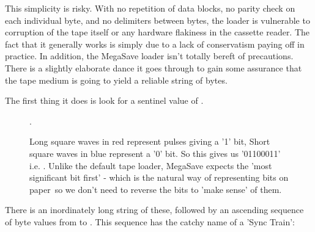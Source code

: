 
	
This simplicity is risky. With no repetition of data blocks, no parity check on each individual byte, and no delimiters between
bytes, the loader is vulnerable to corruption of the tape itself or any hardware flakiness in the cassette reader. The fact
that it generally works is simply due to a lack of conservatism paying off in practice. In addition, the MegaSave loader isn't
totally bereft of precautions. There is a slightly elaborate dance it goes through to gain some assurance that the tape
medium is going to yield a reliable string of bytes.

The first thing it does is look for a sentinel value of . 

\begin{figure}[H]
{
	\begin{adjustbox}{width=14cm,center}
	\end{adjustbox}
}\caption[]{Long square waves in red represent pulses giving a '1' bit, Short square waves in blue represent a '0' bit. So this gives
	us '01100011'\, i.e. . Unlike the default tape loader, MegaSave expects the 'most significant bit first' - which is the
natural way of representing bits on paper\, so we don't need to reverse the bits to 'make sense' of them.}.
	\end{figure}

There is an inordinately long string of these, followed by an ascending sequence of byte values from  to .
This sequence has the catchy name of a 'Sync Train':


